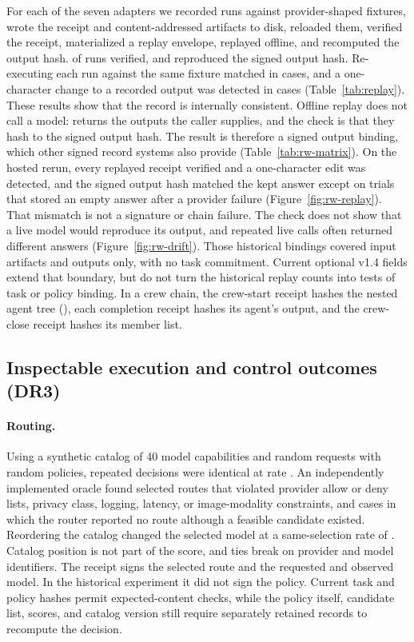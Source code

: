 For each of the seven adapters we recorded runs against provider-shaped fixtures, wrote the receipt and content-addressed artifacts to disk, reloaded them, verified the receipt, materialized a replay envelope, replayed offline, and recomputed the output hash. \ReplayVerified{} of \ReplayRuns{} runs verified, and \ReplayHash{} reproduced the signed output hash. Re-executing each run against the same fixture matched in \ReplayLive{} cases, and a one-character change to a recorded output was detected in \ReplayAltered{} cases (Table~\ref{tab:replay}). These results show that the record is internally consistent. Offline replay does not call a model:  returns the outputs the caller supplies, and the check is that they hash to the signed output hash. The result is therefore a signed output binding, which other signed record systems also provide (Table~\ref{tab:rw-matrix}). On the hosted rerun, every replayed receipt verified and a one-character edit was detected, and the signed output hash matched the kept answer except on trials that stored an empty answer after a provider failure (Figure~\ref{fig:rw-replay}). That mismatch is not a signature or chain failure. The check does not show that a live model would reproduce its output, and repeated live calls often returned different answers (Figure~\ref{fig:rw-drift}). Those historical bindings covered input artifacts and outputs only, with no task commitment. Current optional v1.4 fields extend that boundary, but do not turn the historical replay counts into tests of task or policy binding. In a crew chain, the crew-start receipt hashes the nested agent tree (), each completion receipt hashes its agent's output, and the crew-close receipt hashes its member list.

\subsection{Inspectable execution and control outcomes (DR3)}\label{app:policy-details}

\paragraph{Routing.} Using a synthetic catalog of 40 model capabilities and \RouteRequests{} random requests with random policies, repeated decisions were identical at rate \RouteIdentical{}. An independently implemented oracle found \RouteViolations{} selected routes that violated provider allow or deny lists, privacy class, logging, latency, or image-modality constraints, and \RouteFalseNo{} cases in which the router reported no route although a feasible candidate existed. Reordering the catalog changed the selected model at a same-selection rate of \RoutePermSame{}. Catalog position is not part of the score, and ties break on provider and model identifiers. The receipt signs the selected route and the requested and observed model. In the historical experiment it did not sign the policy. Current task and policy hashes permit expected-content checks, while the policy itself, candidate list, scores, and catalog version still require separately retained records to recompute the decision.

